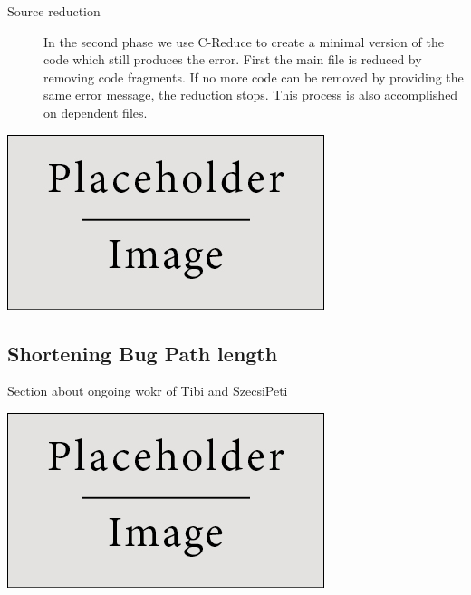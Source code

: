 \documentclass[a0,portrait]{a0poster}
\begin{document}
\begin{multicols}{2}
\begin{description}
  \item[Source reduction] In the second phase we use C-Reduce \cite{creduce} to 
  create a minimal version of the code which still produces the error. First 
  the main file is reduced by removing code fragments. If no more code can be 
  removed by providing the same error message, the reduction stops. This 
  process is also accomplished on dependent files.
\end{description}

\begin{center}\vspace{1cm}
\includegraphics[width=0.8\linewidth]{placeholder}
\end{center}\vspace{1cm}


\subsection*{Shortening Bug Path length}

Section about ongoing wokr of Tibi and SzecsiPeti 

\begin{center}\vspace{1cm}
\includegraphics[width=0.8\linewidth]{placeholder}
\end{center}\vspace{1cm}


\end{multicols}
\end{document}
